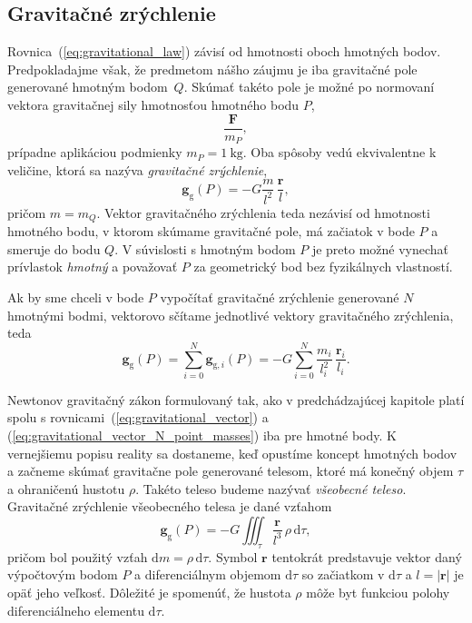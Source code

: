 \documentclass[a4paper, 12pt]{book}
\newcommand{\diff}{\mathrm d}
\newcommand{\gidx}{\mathrm g}
\let\vec\mathbf
\begin{document}
\subsection{Gravitačné zrýchlenie}

Rovnica~(\ref{eq:gravitational_law}) závisí od hmotnosti oboch hmotných bodov.  
Predpokladajme však, že predmetom nášho záujmu je iba gravitačné pole 
generované hmotným bodom~$Q$.  Skúmať takéto pole je možné po normovaní vektora 
gravitačnej sily hmotnosťou hmotného bodu $P$,
%
\begin{equation}
\frac{\vec F}{m_P}{,}
\end{equation}
%
prípadne aplikáciou podmienky $m_P = 1\ \mathrm{kg}$.  Oba spôsoby vedú 
ekvivalentne k veličine, ktorá sa nazýva \emph{gravitačné zrýchlenie},
%
\begin{equation}
\label{eq:gravitational_vector}
\vec g_\gidx(P) = -G \frac{m}{l^2} \, \frac{\vec r}{l}{,}
\end{equation}
%
pričom $m = m_Q$.  Vektor gravitačného zrýchlenia teda nezávisí od hmotnosti 
hmotného bodu, v ktorom skúmame gravitačné pole, má začiatok v bode $P$ 
a smeruje do bodu $Q$.  V súvislosti s hmotným bodom $P$ je preto možné 
vynechať prívlastok \emph{hmotný} a považovať $P$ za geometrický bod bez 
fyzikálnych vlastností.

Ak by sme chceli v bode $P$ vypočítať gravitačné zrýchlenie generované $N$ 
hmotnými bodmi, vektorovo sčítame jednotlivé vektory gravitačného zrýchlenia, 
teda
%
\begin{equation}
\label{eq:gravitational_vector_N_point_masses}
\vec g_\gidx(P) = \sum_{i = 0}^{N}\vec g_{\gidx,i}(P) = -G \sum_{i = 0}^{N} 
\frac{m_i}{l_i^2} \, \frac{\vec r_i}{l_i}{.}
\end{equation}

Newtonov gravitačný zákon formulovaný tak, ako v predchádzajúcej kapitole platí 
spolu s rovnicami~(\ref{eq:gravitational_vector}) 
a (\ref{eq:gravitational_vector_N_point_masses}) iba pre hmotné body.  
K vernejšiemu popisu reality sa dostaneme, keď opustíme koncept hmotných bodov 
a začneme skúmať gravitačne pole generované telesom, ktoré má konečný objem 
$\tau$ a ohraničenú hustotu $\rho$.  Takéto teleso budeme nazývať 
\emph{všeobecné teleso}.  Gravitačné zrýchlenie všeobecného telesa je dané 
vzťahom
%
\begin{equation}
\label{eq:gravitational_vector_integral}
\vec g_\gidx(P) = -G \iiint_{\tau} \frac{\vec r}{l^3} \, \rho \, \diff\tau{,}
\end{equation}
%
pričom bol použitý vzťah $\diff m = \rho \, \diff \tau$.  Symbol $\vec r$ 
tentokrát predstavuje vektor daný výpočtovým bodom $P$ a diferenciálnym objemom 
$\diff\tau$ so začiatkom v $\diff\tau$ a $l = | \vec r |$ je opäť jeho veľkosť.  
Dôležité je spomenúť, že hustota $\rho$ môže byt funkciou polohy 
diferenciálneho elementu $\diff\tau$.
\end{document}
